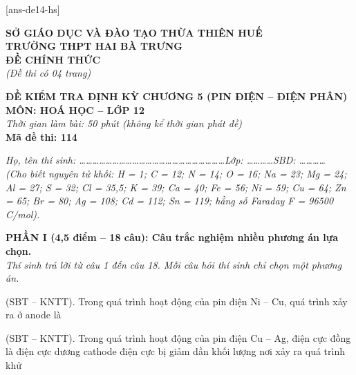 \documentclass[11pt,a4paper]{article}
\def\loigiai#1{}
\begin{document}
[ans-de14-hs]

\noindent
\begin{minipage}[t]{0.48\textwidth}
	\textbf{SỞ GIÁO DỤC VÀ ĐÀO TẠO THỪA THIÊN HUẾ}\\
	\textbf{TRƯỜNG THPT HAI BÀ TRƯNG}\\
	\textbf{ĐỀ CHÍNH THỨC}\\
	\textit{(Đề thi có 04 trang)}
\end{minipage}\hfill
\begin{minipage}[t]{0.48\textwidth}
	\raggedleft
	\textbf{\color{mainGreen}ĐỀ KIỂM TRA ĐỊNH KỲ CHƯƠNG 5 (PIN ĐIỆN – ĐIỆN PHÂN)}\\
	\textbf{MÔN: HOÁ HỌC -- LỚP 12}\\
	\textit{Thời gian làm bài: 50 phút (không kể thời gian phát đề)}\\
	\textbf{Mã đề thi: 114}
\end{minipage}


\vspace{1pt}
\noindent\textit{Họ, tên thí sinh: \dots\dots\dots\dots\dots\dots\dots\dots\dots\dots\dots\dots\dots\dots\dots\dots\dots\dots\dots\dots\dots\dots Lớp: \dots\dots\dots\dots SBD: \dots\dots\dots\dots}\\
\noindent\textit{(Cho biết nguyên tử khối: H = 1; C = 12; N = 14; O = 16; Na = 23; Mg = 24; Al = 27; S = 32; Cl = 35,5; K = 39; Ca = 40; Fe = 56; Ni = 59; Cu = 64; Zn = 65; Br = 80; Ag = 108; Cd = 112; Sn = 119; hằng số Faraday F = 96500 C/mol).}

\vspace{2pt}
\noindent
\textbf{PHẦN I (4,5 điểm -- 18 câu): Câu trắc nghiệm nhiều phương án lựa chọn.}\\
\textit{Thí sinh trả lời từ câu 1 đến câu 18. Mỗi câu hỏi thí sinh chỉ chọn một phương án.}

\setcounter{ex}{0}

\begin{ex}
(SBT – KNTT). Trong quá trình hoạt động của pin điện Ni -- Cu, quá trình xảy ra ở anode là
\choice
{}
{}
{}
{}
\loigiai{}
\end{ex}

\begin{ex}
(SBT – KNTT). Trong quá trình hoạt động của pin điện Cu -- Ag, điện cực đồng là
\choice
{điện cực dương}
{cathode}
{điện cực bị giảm dần khối lượng}
{nơi xảy ra quá trình khử}
\loigiai{}
\end{ex}
\end{document}
